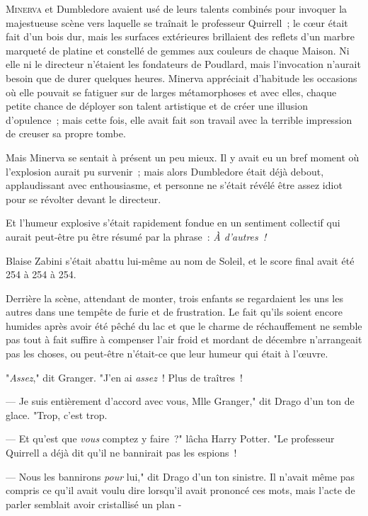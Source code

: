 
\lettrine{M}{inerva} et Dumbledore avaient usé de leurs talents combinés pour invoquer la majestueuse scène vers laquelle se traînait le professeur Quirrell~; le cœur était fait d'un bois dur, mais les surfaces extérieures brillaient des reflets d'un marbre marqueté de platine et constellé de gemmes aux couleurs de chaque Maison. Ni elle ni le directeur n'étaient les fondateurs de Poudlard, mais l'invocation n'aurait besoin que de durer quelques heures. Minerva appréciait d'habitude les occasions où elle pouvait se fatiguer sur de larges métamorphoses et avec elles, chaque petite chance de déployer son talent artistique et de créer une illusion d'opulence~; mais cette fois, elle avait fait son travail avec la terrible impression de creuser sa propre tombe.

Mais Minerva se sentait à présent un peu mieux. Il y avait eu un bref moment où l'explosion aurait pu survenir~; mais alors Dumbledore était déjà debout, applaudissant avec enthousiasme, et personne ne s'était révélé être assez idiot pour se révolter devant le directeur.

Et l'humeur explosive s'était rapidement fondue en un sentiment collectif qui aurait peut-être pu être résumé par la phrase~: \emph{À d'autres~!}

Blaise Zabini s'était abattu lui-même au nom de Soleil, et le score final avait été 254 à 254 à 254.

\later

Derrière la scène, attendant de monter, trois enfants se regardaient les uns les autres dans une tempête de furie et de frustration. Le fait qu'ils soient encore humides après avoir été pêché du lac et que le charme de réchauffement ne semble pas tout à fait suffire à compenser l'air froid et mordant de décembre n'arrangeait pas les choses, ou peut-être n'était-ce que leur humeur qui était à l'œuvre.

"\emph{Assez}," dit Granger. "J'en ai \emph{assez}~! Plus de traîtres~!

--- Je suis entièrement d'accord avec vous, Mlle Granger," dit Drago d'un ton de glace. "Trop, c'est trop.

--- Et qu'est que \emph{vous} comptez y faire~?" lâcha Harry Potter. "Le professeur Quirrell a déjà dit qu'il ne bannirait pas les espions~!

--- Nous les bannirons \emph{pour} lui," dit Drago d'un ton sinistre. Il n'avait même pas compris ce qu'il avait voulu dire lorsqu'il avait prononcé ces mots, mais l'acte de parler semblait avoir cristallisé un plan -

